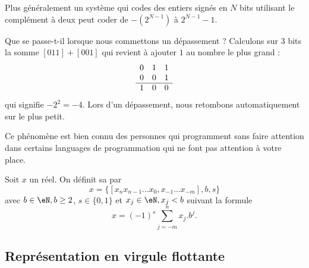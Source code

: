 Plus généralement un système qui codes des entiers signés en \( N\) bits utilisant le complément à deux peut coder de \( -(2^{N-1})\) à \( 2^{N-1}-1\).

\begin{normaltext}[Le dépassement]
    Que se passe-t-il lorsque nous commettons un dépassement ? Calculons sur \( 3\) bits la somme \( [011]+[001]\) qui revient à ajouter \( 1\) au nombre le plus grand :
    \begin{equation*}
        \begin{array}[]{ccc}
            0&1&1\\
            0&0&1\\
            \hline
            1&0&0\\
        \end{array}
    \end{equation*}
    qui signifie \( -2^2=-4\). Lors d'un dépassement, nous retombons automatiquement sur le plus petit.

    Ce phénomène est bien connu des personnes qui programment sans faire attention dans certains languages de programmation qui ne font pas attention à votre place.
\end{normaltext}


\begin{definition}
	Soit $x$ un réel. On définit sa  par
	\begin{equation}
		x=\{[x_nx_{n-1}...x_0,x_{-1}...x_{-m}], b, s\}
	\end{equation}
	avec  $b\in\eN, b\geq2$, $s\in\{0,1\}$ et $x_j\in\eN,x_j<b$ suivant la formule
	\begin{equation}
		x=(-1)^{s}\sum_{j=-m}^nx_j.b^j.
	\end{equation}
\end{definition}

\subsection{Représentation en virgule flottante}

